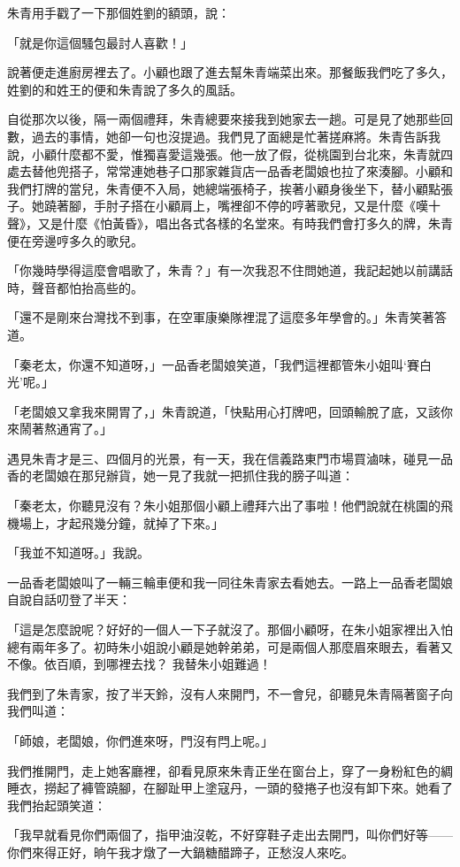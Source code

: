 \documentclass[b5paper,11pt,twoside,twocolumn]{ctexbook}
\begin{document}
朱青用手戳了一下那個姓劉的額頭，說：

「就是你這個騷包最討人喜歡！」

說著便走進廚房裡去了。小顧也跟了進去幫朱青端菜出來。那餐飯我們吃了多久，姓劉的和姓王的便和朱青說了多久的風話。

自從那次以後，隔一兩個禮拜，朱青總要來接我到她家去一趟。可是見了她那些回數，過去的事情，她卻一句也沒提過。我們見了面總是忙著搓麻將。朱青告訴我說，小顧什麼都不愛，惟獨喜愛這幾張。他一放了假，從桃園到台北來，朱青就四處去替他兜搭子，常常連她巷子口那家雜貨店一品香老闆娘也拉了來湊腳。小顧和我們打牌的當兒，朱青便不入局，她總端張椅子，挨著小顧身後坐下，替小顧點張子。她蹺著腳，手肘子搭在小顧肩上，嘴裡卻不停的哼著歌兒，又是什麼《嘆十聲》，又是什麼《怕黃昏》，唱出各式各樣的名堂來。有時我們會打多久的牌，朱青便在旁邊哼多久的歌兒。

「你幾時學得這麼會唱歌了，朱青？」有一次我忍不住問她道，我記起她以前講話時，聲音都怕抬高些的。

「還不是剛來台灣找不到事，在空軍康樂隊裡混了這麼多年學會的。」朱青笑著答道。

「秦老太，你還不知道呀，」一品香老闆娘笑道，「我們這裡都管朱小姐叫‘賽白光’呢。」

「老闆娘又拿我來開胃了，」朱青說道，「快點用心打牌吧，回頭輸脫了底，又該你來鬧著熬通宵了。」

遇見朱青才是三、四個月的光景，有一天，我在信義路東門市場買滷味，碰見一品香的老闆娘在那兒辦貨，她一見了我就一把抓住我的膀子叫道：

「秦老太，你聽見沒有？朱小姐那個小顧上禮拜六出了事啦！他們說就在桃園的飛機場上，才起飛幾分鐘，就掉了下來。」

「我並不知道呀。」我說。

一品香老闆娘叫了一輛三輪車便和我一同往朱青家去看她去。一路上一品香老闆娘自說自話叨登了半天：

「這是怎麼說呢？好好的一個人一下子就沒了。那個小顧呀，在朱小姐家裡出入怕總有兩年多了。初時朱小姐說小顧是她幹弟弟，可是兩個人那麼眉來眼去，看著又不像。依百順，到哪裡去找？ 我替朱小姐難過！

我們到了朱青家，按了半天鈴，沒有人來開門，不一會兒，卻聽見朱青隔著窗子向我們叫道：

「師娘，老闆娘，你們進來呀，門沒有閂上呢。」

我們推開門，走上她客廳裡，卻看見原來朱青正坐在窗台上，穿了一身粉紅色的綢睡衣，撈起了褲管蹺腳，在腳趾甲上塗寇丹，一頭的發捲子也沒有卸下來。她看了我們抬起頭笑道：

「我早就看見你們兩個了，指甲油沒乾，不好穿鞋子走出去開門，叫你們好等——你們來得正好，晌午我才燉了一大鍋糖醋蹄子，正愁沒人來吃。
\end{document}
